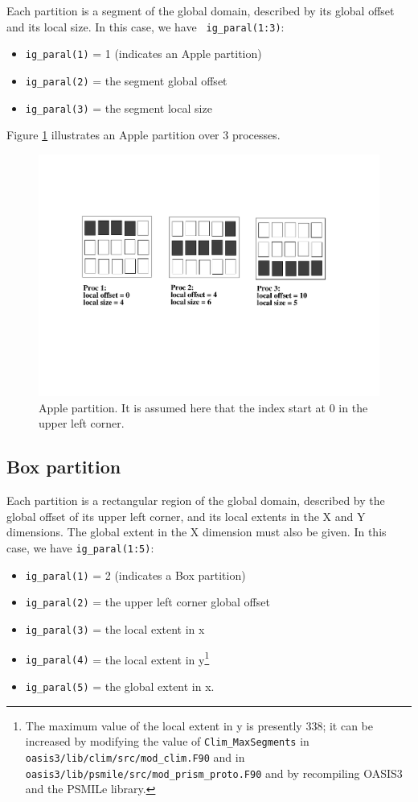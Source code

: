 Each partition is a segment of the global domain, described by its
global offset and its local size. In this case, we have {\tt
ig\_paral(1:3)}:
\begin{itemize}
 \item {\tt ig\_paral(1)} = 1 (indicates an Apple partition)
 \item {\tt ig\_paral(2)} = the segment global offset
 \item {\tt ig\_paral(3)} = the segment local size
\end{itemize}

Figure \ref{apple_partition} illustrates an Apple partition over 3
processes. 
\begin{figure}
\includegraphics[scale=.6]{figures/apple_new} 
\caption{Apple partition. It is assumed here that the index start at 0 in the upper left corner.}
\label{apple_partition}
\end{figure}


\subsection{Box partition} 

Each partition is a rectangular region of the global domain, described
by the global offset of its upper left corner, and its local extents in the
X and Y dimensions. The global extent in the X dimension must also be
given. In this case, we have {\tt ig\_paral(1:5)}:
\begin{itemize}
 \item {\tt ig\_paral(1)} = 2 (indicates a Box partition)
 \item {\tt ig\_paral(2)} = the upper left corner global offset
 \item {\tt ig\_paral(3)} = the local extent in x
 \item {\tt ig\_paral(4)} = the local extent in y\footnote{The maximum
value of the local extent in y is presently 338; it can be increased
by modifying the value of {\tt Clim\_MaxSegments} in {\tt
oasis3/lib/clim/src/mod\_clim.F90} and in {\tt
oasis3/lib/psmile/src/mod\_prism\_proto.F90} and by recompiling
OASIS3 and the PSMILe library.}
 \item {\tt ig\_paral(5)} = the global extent in x.
\end{itemize}

